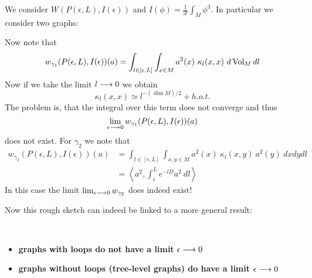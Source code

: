 \begin{sketch}
  We consider $W(P(\epsilon,L), I(\epsilon))$ and $I(\phi) = \frac{1}{3!} \int_M \phi^3$. In particular we consider two graphs:

  \begin{center}
  \end{center}

  Now note that
  $$ w_{\gamma_1} (P(\epsilon,L), I(\epsilon))(a) = \int_{l\in[\epsilon,L]} \int_{x\in M} a^2(x) \ \kappa_l(x,x) \ d\vol_M dl$$
  Now if we take the limit $l \longrightarrow 0$ we obtain
  $$ \kappa_l(x,x) \simeq l^{-(\dim M)/2} + h.o.t. $$
  The problem is, that the integral over this term does not converge and thus
  $$ \lim_{\epsilon \lra 0} w_{\gamma_1} (P(\epsilon,L), I(\epsilon))(a) $$
  does not exist. For $\gamma_2$ we note that
  \begin{align}
    w_{\gamma_2} (P(\epsilon,L), I(\epsilon))(a) &= \int_{l\in[\epsilon,L]} \int_{x,y\in M} a^2(x) \ \kappa_l(x,y) \ a^2(y) \ dx dy dl \\
    &= \left\langle a^2, \int_\epsilon^L e^{-lD} a^2 \ dl \right\rangle
  \end{align}
  In this case the limit $\lim_{\epsilon \lra 0} w_{\gamma_2}$ does indeed exist!
\end{sketch}

Now this rough sketch can indeed be linked to a more general result:

\begin{fact}~
\begin{itemize}
  \item \textbf{graphs with loops do not have a limit} $\epsilon \lra 0$
  \item \textbf{graphs without loops (tree-level graphs) do have a limit} $\epsilon \lra 0$
\end{itemize}
\end{fact}

